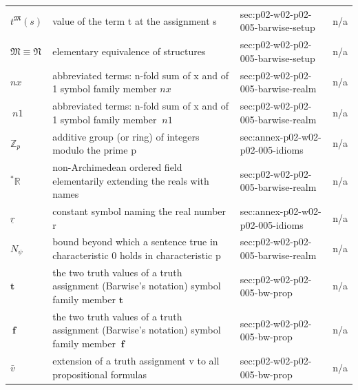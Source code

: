 \begin{longtable}{@{}p{}p{}p{}p{}@{}}
\(t^{\mathfrak M}(s)\) & value of the term t at the assignment s & sec:\allowbreak{}p02-\allowbreak{}w02-\allowbreak{}p02-\allowbreak{}005-\allowbreak{}barwise-\allowbreak{}setup & n/a \\
\(\mathfrak M\equiv\mathfrak N\) & elementary equivalence of structures & sec:\allowbreak{}p02-\allowbreak{}w02-\allowbreak{}p02-\allowbreak{}005-\allowbreak{}barwise-\allowbreak{}setup & n/a \\
\(nx\) & abbreviated terms: n-fold sum of x and of 1 symbol family member \(nx\) & sec:\allowbreak{}p02-\allowbreak{}w02-\allowbreak{}p02-\allowbreak{}005-\allowbreak{}barwise-\allowbreak{}realm & n/a \\
\(\ n1\) & abbreviated terms: n-fold sum of x and of 1 symbol family member \(\ n1\) & sec:\allowbreak{}p02-\allowbreak{}w02-\allowbreak{}p02-\allowbreak{}005-\allowbreak{}barwise-\allowbreak{}realm & n/a \\
\(\mathbb Z_p\) & additive group (or ring) of integers modulo the prime p & sec:\allowbreak{}annex-\allowbreak{}p02-\allowbreak{}w02-\allowbreak{}p02-\allowbreak{}005-\allowbreak{}idioms & n/a \\
\({}^*\mathbb R\) & non-Archimedean ordered field elementarily extending the reals with names & sec:\allowbreak{}p02-\allowbreak{}w02-\allowbreak{}p02-\allowbreak{}005-\allowbreak{}barwise-\allowbreak{}realm & n/a \\
\(\underline r\) & constant symbol naming the real number r & sec:\allowbreak{}annex-\allowbreak{}p02-\allowbreak{}w02-\allowbreak{}p02-\allowbreak{}005-\allowbreak{}idioms & n/a \\
\(N_\psi\) & bound beyond which a sentence true in characteristic 0 holds in characteristic p & sec:\allowbreak{}p02-\allowbreak{}w02-\allowbreak{}p02-\allowbreak{}005-\allowbreak{}barwise-\allowbreak{}realm & n/a \\
\(\mathbf t\) & the two truth values of a truth assignment (Barwise's notation) symbol family member \(\mathbf t\) & sec:\allowbreak{}p02-\allowbreak{}w02-\allowbreak{}p02-\allowbreak{}005-\allowbreak{}bw-\allowbreak{}prop & n/a \\
\(\ \mathbf f\) & the two truth values of a truth assignment (Barwise's notation) symbol family member \(\ \mathbf f\) & sec:\allowbreak{}p02-\allowbreak{}w02-\allowbreak{}p02-\allowbreak{}005-\allowbreak{}bw-\allowbreak{}prop & n/a \\
\(\bar v\) & extension of a truth assignment v to all propositional formulas & sec:\allowbreak{}p02-\allowbreak{}w02-\allowbreak{}p02-\allowbreak{}005-\allowbreak{}bw-\allowbreak{}prop & n/a \\

\end{longtable}
